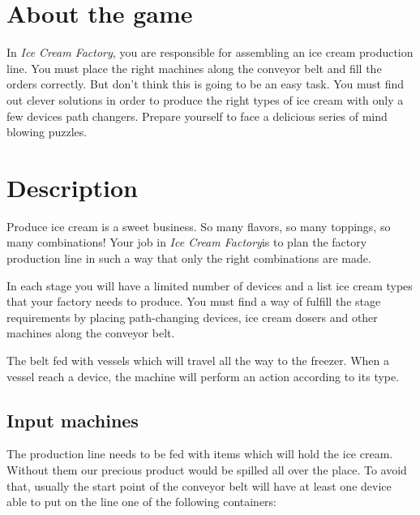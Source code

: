 \documentclass[a4paper]{scrartcl}
\title{\gamename}
\subtitle{Game Design Document}
\author{}
\date{\today}
\begin{document}
\newcommand{\gamename}{\emph{Ice Cream Factory}}

\maketitle

\section{About the game}
    In \gamename, you are responsible for assembling an ice cream production
    line. You must place the right machines along the conveyor belt and fill the
    orders correctly. But don't think this is going to be an easy task. You must
    find out clever solutions in order to produce the right types of ice cream
    with only a few devices path changers. Prepare yourself to face a delicious
    series of mind blowing puzzles.

\section{Description}
    Produce ice cream is a sweet business. So many flavors, so many toppings, so
    many combinations! Your job in \gamename is to plan the factory production
    line in such a way that only the right combinations are made.

    In each stage you will have a limited number of devices and a list ice cream
    types that your factory needs to produce. You must find a way of fulfill the
    stage requirements by placing path-changing devices, ice cream dosers and
    other machines along the conveyor belt.

    The belt fed with vessels which will travel all the way to the freezer. When
    a vessel reach a device, the machine will perform an action according to its
    type.

    \subsection{Input machines}
        The production line needs to be fed with items which will hold the ice
        cream. Without them our precious product would be spilled all over the
        place. To avoid that, usually the start point of the conveyor belt will
        have at least one device able to put on the line one of the following
        containers:
\end{document}
